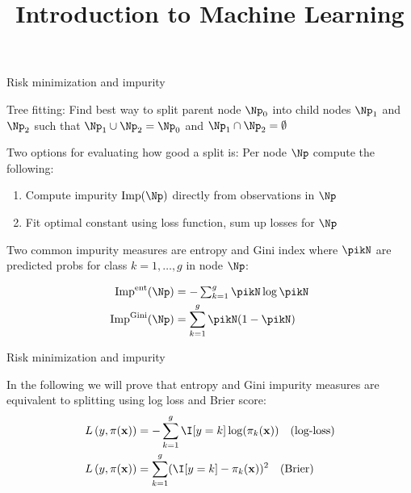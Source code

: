 \documentclass[11pt,compress,t,notes=noshow, xcolor=table]{beamer}
\title{Introduction to Machine Learning}
\begin{document}
    

\begin{framei}[sep=M]{Risk minimization and impurity}

\item Tree fitting: Find best way to split parent node $\Np_0$ into child nodes $\Np_1$ and $\Np_2$ such that $\Np_1 \cup \Np_2 = \Np_0$ and $\Np_1 \cap \Np_2 = \emptyset$
\item Two options for evaluating how good a split is: Per node $\Np$ compute the following:
\begin{enumerate}
\item Compute impurity $\text{Imp}(\Np)$ directly from observations in $\Np$
\item Fit optimal constant using loss function, sum up losses for $\Np$
\end{enumerate}
\item  Two common impurity measures are entropy and Gini index where $\pikN$ are predicted probs for class $k=1,\ldots,g$ in node $\Np$:

\begin{align*}
    \text{Imp}^{\text{ent}}(\Np) &= -\textstyle\sum_{k = 1}^g \pikN \log \pikN\\
    \text{Imp}^{\text{Gini}}(\Np) &= \sum_{k=1}^g \pikN (1-\pikN )
\end{align*}


\end{framei}


\begin{framei}[sep=M]{Risk minimization and impurity}
\item In the following we will prove that entropy and Gini impurity measures are equivalent to splitting using log loss and Brier score:
\begin{align*}
    \Lpixy &= -\sum_{k = 1}^g \I [y=k] \log (\pi_k(\xv)) \quad \text{(log-loss)}\\
    \Lpixy &= \sum_{k = 1}^g (\I [y=k] - \pi_k(\xv))^2 \quad \text{(Brier)}
\end{align*}


\end{framei}
\end{document}
